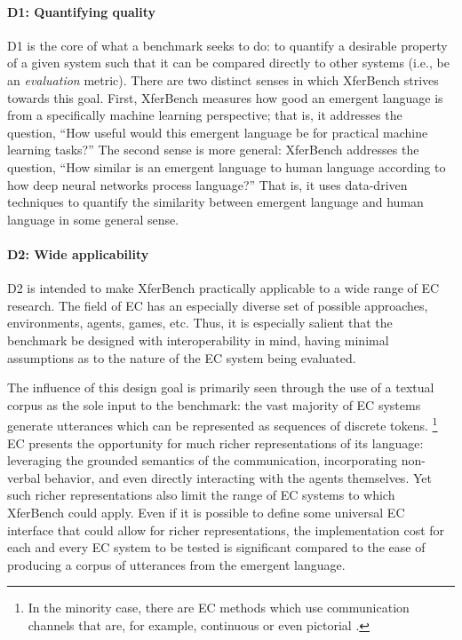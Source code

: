 \paragraph{D1: Quantifying quality}
D1 is the core of what a benchmark seeks to do: to quantify a desirable property of a given system such that it can be compared directly to other systems (i.e., be an \emph{evaluation} metric).
There are two distinct senses in which XferBench strives towards this goal.
First, XferBench measures how good an emergent language is from a specifically machine learning perspective;
  that is, it addresses the question, ``How useful would this emergent language be for practical machine learning tasks?''
The second sense is more general: XferBench addresses the question, ``How similar is an emergent language to human language according to how deep neural networks process language?''
That is, it uses data-driven techniques to quantify the similarity between emergent language and human language in some general sense.

\paragraph{D2: Wide applicability}
D2 is intended to make XferBench practically applicable to a wide range of EC research.
The field of EC has an especially diverse set of possible approaches, environments, agents, games, etc.
Thus, it is especially salient that the benchmark be designed with interoperability in mind, having minimal assumptions as to the nature of the EC system being evaluated.

The influence of this design goal is primarily seen through the use of a textual corpus as the sole input to the benchmark: the vast majority of EC systems generate utterances which can be represented as sequences of discrete tokens.
\unskip\footnote{In the minority case, there are EC methods which use communication channels that are, for example, continuous \citep{Eloff2021TowardsLT} or even pictorial \citep{Mihai2021LearningTD}.}
EC presents the opportunity for much richer representations of its language: leveraging the grounded semantics of the communication, incorporating non-verbal behavior, and even directly interacting with the agents themselves.
Yet such richer representations also limit the range of EC systems to which XferBench could apply.
Even if it is possible to define some universal EC interface that could allow for richer representations, the implementation cost for each and every EC system to be tested is significant compared to the ease of producing a corpus of utterances from the emergent language.

